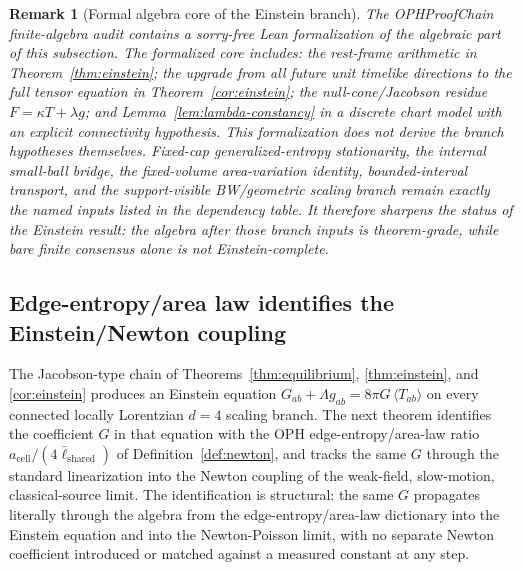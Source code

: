 \documentclass[11pt]{article}
\newtheorem{remark}[theorem]{Remark}
\begin{document}
\begin{remark}[Formal algebra core of the Einstein branch]\label{rem:formal-einstein-core}
The OPHProofChain finite-algebra audit contains a sorry-free Lean formalization of the
algebraic part of this subsection. The formalized core includes: the
rest-frame arithmetic in Theorem~\ref{thm:einstein}; the upgrade from all
future unit timelike directions to the full tensor equation in
Theorem~\ref{cor:einstein}; the null-cone/Jacobson residue
\(F=\kappa T+\lambda g\); and Lemma~\ref{lem:lambda-constancy} in a discrete
chart model with an explicit connectivity hypothesis. This formalization does
not derive the branch hypotheses themselves. Fixed-cap generalized-entropy
stationarity, the internal small-ball bridge, the fixed-volume area-variation
identity, bounded-interval transport, and the support-visible BW/geometric
scaling branch remain exactly the named inputs listed in the dependency table.
It therefore sharpens the status of the Einstein result: the algebra after
those branch inputs is theorem-grade, while bare finite consensus alone is not
Einstein-complete.
\end{remark}

\subsection{Edge-entropy/area law identifies the Einstein/Newton coupling}\label{subsec:edge-entropy-newton-coupling}

The Jacobson-type chain of Theorems~\ref{thm:equilibrium}, \ref{thm:einstein}, and \ref{cor:einstein} produces an Einstein equation \(G_{ab}+\Lambda g_{ab}=8\pi G\,\langle T_{ab}\rangle\) on every connected locally Lorentzian \(d=4\) scaling branch. The next theorem identifies the coefficient \(G\) in that equation with the OPH edge-entropy/area-law ratio \(a_{\mathrm{cell}}/(4\bar\ell_{\mathrm{shared}})\) of Definition~\ref{def:newton}, and tracks the same \(G\) through the standard linearization into the Newton coupling of the weak-field, slow-motion, classical-source limit. The identification is structural: the same \(G\) propagates literally through the algebra from the edge-entropy/area-law dictionary into the Einstein equation and into the Newton-Poisson limit, with no separate Newton coefficient introduced or matched against a measured constant at any step.
\end{document}
